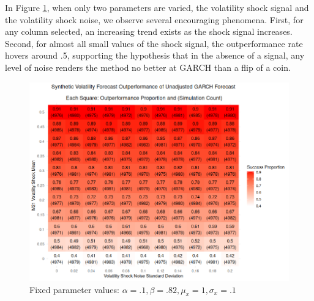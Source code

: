 \documentclass[11pt]{article}
\theoremstyle{definition}
\begin{document}
In Figure \ref{fig:heavy_beta}, when only two parameters are varied, the volatility shock signal and the volatility shock noise, we observe several encouraging phenomena.  First, for any column selected, an increasing trend exists as the shock signal increases.  Second, for almost all small values of the shock signal, the outperformance rate hovers around .5, supporting the hypothesis that in the absence of a signal, any level of noise renders the method no better at GARCH than a flip of a coin.
\begin{figure}[h!]
  \begin{center}
    \includegraphics[scale=.45]{simulation_plots/standard_simulation_alpha_.1_beta_.82.png}
    \caption{Fixed parameter values: $\alpha = .1, \beta = .82, \mu_{x} = 1, \sigma_{x} = .1$}\label{fig:heavy_beta}
  \end{center}
  \end{figure}
  
\end{document}
